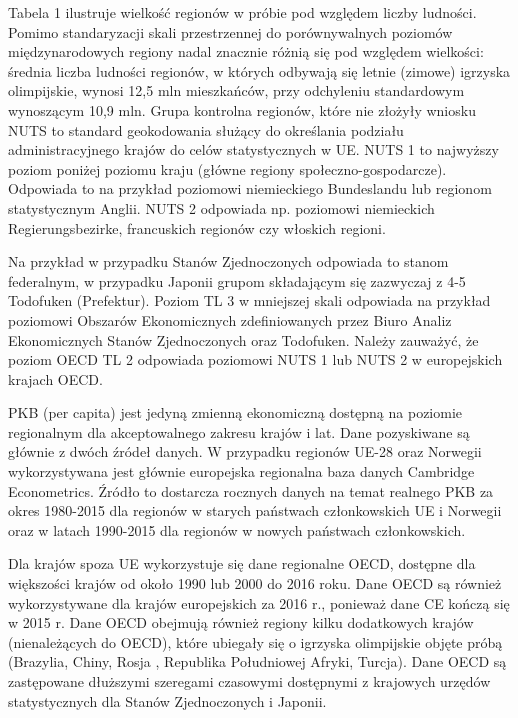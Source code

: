 \documentclass[12pt]{article}
\begin{document}
    Tabela 1 ilustruje wielkość regionów w próbie pod względem liczby ludności. Pomimo standaryzacji skali przestrzennej do porównywalnych poziomów międzynarodowych regiony nadal znacznie różnią się pod względem wielkości: średnia liczba ludności regionów, w których odbywają się letnie (zimowe) igrzyska olimpijskie, wynosi 12,5 mln mieszkańców, przy odchyleniu standardowym wynoszącym 10,9 mln. Grupa kontrolna regionów, które nie złożyły wniosku NUTS to standard geokodowania służący do określania podziału administracyjnego krajów do celów statystycznych w UE. NUTS 1 to najwyższy poziom poniżej poziomu kraju (główne regiony społeczno-gospodarcze). Odpowiada to na przykład poziomowi niemieckiego Bundeslandu lub regionom statystycznym Anglii. NUTS 2 odpowiada np. poziomowi niemieckich Regierungsbezirke, francuskich regionów czy włoskich regioni.
    
    Na przykład w przypadku Stanów Zjednoczonych odpowiada to stanom federalnym, w przypadku Japonii grupom składającym się zazwyczaj z 4-5 Todofuken (Prefektur). Poziom TL 3 w mniejszej skali odpowiada na przykład poziomowi Obszarów Ekonomicznych zdefiniowanych przez Biuro Analiz Ekonomicznych Stanów Zjednoczonych oraz Todofuken. Należy zauważyć, że poziom OECD TL 2 odpowiada poziomowi NUTS 1 lub NUTS 2 w europejskich krajach OECD.
    
    PKB (per capita) jest jedyną zmienną ekonomiczną dostępną na poziomie regionalnym dla akceptowalnego zakresu krajów i lat. Dane pozyskiwane są głównie z dwóch źródeł danych. W przypadku regionów UE-28 oraz Norwegii wykorzystywana jest głównie europejska regionalna baza danych Cambridge Econometrics. Źródło to dostarcza rocznych danych na temat realnego PKB za okres 1980-2015 dla regionów w starych państwach członkowskich UE i Norwegii oraz w latach 1990-2015 dla regionów w nowych państwach członkowskich.
    
    Dla krajów spoza UE wykorzystuje się dane regionalne OECD, dostępne dla większości krajów od około 1990 lub 2000 do 2016 roku. Dane OECD są również wykorzystywane dla krajów europejskich za 2016 r., ponieważ dane CE kończą się w 2015 r. Dane OECD obejmują również regiony kilku dodatkowych krajów (nienależących do OECD), które ubiegały się o igrzyska olimpijskie objęte próbą (Brazylia, Chiny, Rosja , Republika Południowej Afryki, Turcja). Dane OECD są zastępowane dłuższymi szeregami czasowymi dostępnymi z krajowych urzędów statystycznych dla Stanów Zjednoczonych i Japonii.
    
\end{document}
